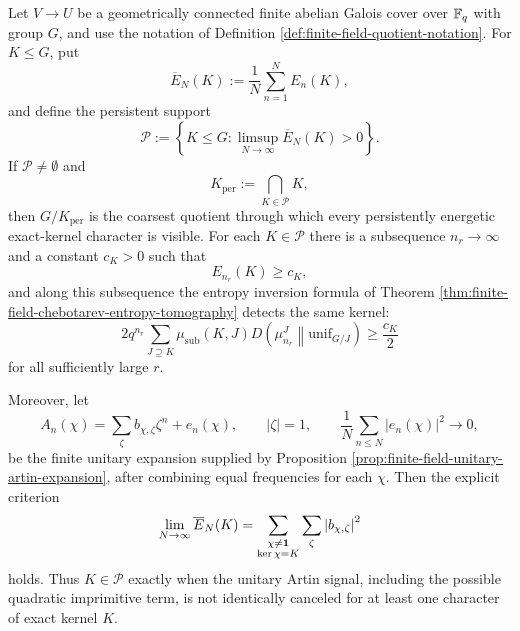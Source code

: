 \begin{theorem}\label{thm:kernel-chebotarev-persistent-energy-detection}
Let \(V\to U\) be a geometrically connected finite \etale{} abelian Galois cover over \(\mathbb{F}_q\) with group \(G\), and use the notation of Definition \ref{def:finite-field-quotient-notation}. For \(K\le G\), put
\[
\overline E_N(K):=\frac1N\sum_{n=1}^N E_n(K),
\]
and define the persistent support
\[
\mathcal P:=\left\{K\le G:\limsup_{N\to\infty}\overline E_N(K)>0\right\}.
\]
If \(\mathcal P\ne\emptyset\) and
\[
K_{\mathrm{per}}:=\bigcap_{K\in\mathcal P}K,
\]
then \(G/K_{\mathrm{per}}\) is the coarsest quotient through which every persistently energetic exact-kernel character is visible. For each \(K\in\mathcal P\) there is a subsequence \(n_r\to\infty\) and a constant \(c_K>0\) such that
\[
E_{n_r}(K)\ge c_K,
\]
and along this subsequence the entropy inversion formula of Theorem \ref{thm:finite-field-chebotarev-entropy-tomography} detects the same kernel:
\[
2q^{n_r}\sum_{J\supseteq K}\mu_{\mathrm{sub}}(K,J)
D\!\left(\mu_{n_r}^J\middle\|\mathrm{unif}_{G/J}\right)
\ge \frac{c_K}{2}
\]
for all sufficiently large \(r\).

Moreover, let
\[
A_n(\chi)=\sum_{\zeta}b_{\chi,\zeta}\zeta^n+e_n(\chi),
\qquad |\zeta|=1,
\qquad
\frac1N\sum_{n\le N}|e_n(\chi)|^2\longrightarrow0,
\]
be the finite unitary expansion supplied by Proposition \ref{prop:finite-field-unitary-artin-expansion}, after combining equal frequencies for each \(\chi\). Then the explicit criterion
\[
\lim_{N\to\infty}\overline E_N(K)
=
\sum_{\substack{\chi\ne\mathbf{1}\\ \ker\chi=K}}
\sum_{\zeta}\left|b_{\chi,\zeta}\right|^2
\]
holds. Thus \(K\in\mathcal P\) exactly when the unitary Artin signal, including the possible quadratic imprimitive term, is not identically canceled for at least one character of exact kernel \(K\).
\end{theorem}

